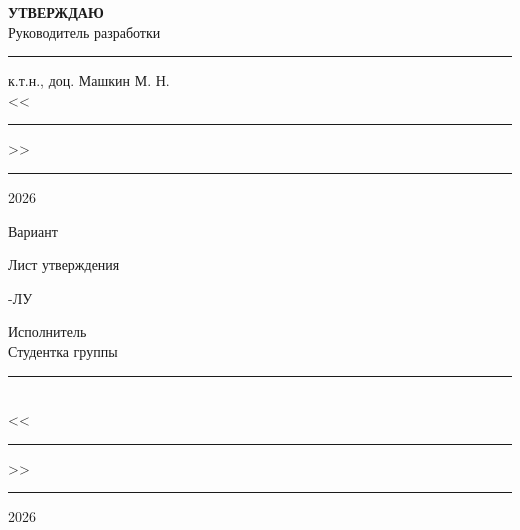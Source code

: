 \thispagestyle{firststyle}
\begin{flushright}
	\noindent\textbf{\large УТВЕРЖДАЮ}\\
	Руководитель разработки\\
	\rule{2.5cm}{.6pt} к.т.н., доц. Машкин М. Н.\\
	<<\rule{7mm}{.6pt}>> \rule{3cm}{.6pt} 2026
\end{flushright}

\vfill\vfill

\begin{center}
\bfseries\large
\doctitle

\bigskip
Вариант \variant

\bigskip
\docname

\bigskip
Лист утверждения

\bigskip
\docstamp-ЛУ
\end{center}

\vfill

\begin{flushright}
	\noindent Исполнитель\\
	Студентка группы \grp\\
	\rule{2.5cm}{.6pt} \shname\\
	<<\rule{7mm}{.6pt}>> \rule{3cm}{.6pt} 2026
\end{flushright}

\vfill

\reversemarginpar{}